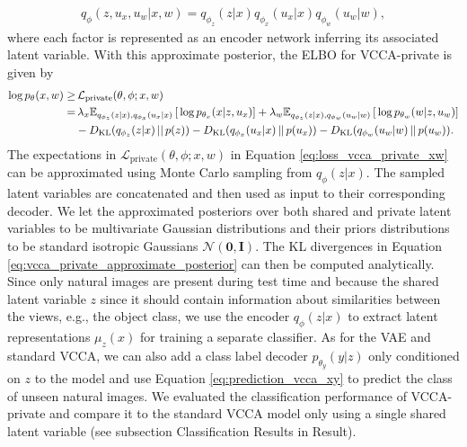 \begin{align}\label{eq:vcca_private_approximate_posterior}
    q_{\phi}(z, u_{x}, u_{w} | x, w) = q_{\phi_{z}}(z | x) q_{\phi_{x}}(u_{x} | x) q_{\phi_{w}}(u_{w} | w),
\end{align}
where each factor is represented as an encoder network inferring its associated latent variable. With this approximate posterior, the ELBO for VCCA-private is given by
\begin{align}
    \begin{split} \label{eq:loss_vcca_private_xw}
        \log p_{\theta}(x, w) \geq & \, \mathcal{L}_{\text{private}}(\theta, \phi; x, w) \\ 
        = & \, \lambda_{x} \mathbb{E}_{q_{\phi_{z}}(z|x), q_{\phi_{x}}(u_{x}|x)}\left[\, \log p_{\theta_{x}}(x | z, u_{x}) \right] + \lambda_{w}  \mathbb{E}_{q_{\phi_{z}}(z|x), q_{\phi_{w}}(u_{w}|w)}\left[\, \log p_{\theta_{w}}(w | z, u_{w}) \right] \\ 
        & - D_{\mathrm{KL}}(q_{\phi_{z}}(z|x)\,||\,p(z)) - D_{\mathrm{KL}}(q_{\phi_{x}}(u_{x}|x)\,||\,p(u_{x})) - D_{\mathrm{KL}}(q_{\phi_{w}}(u_{w} |w)\,||\,p(u_{w})) .
    \end{split}
\end{align}
The expectations in $\mathcal{L}_{\text{private}}(\theta, \phi; x, w)$ in Equation \ref{eq:loss_vcca_private_xw} can be approximated using Monte Carlo sampling from $q_{\phi}(z | x)$. The sampled latent variables are concatenated and then used as input to their corresponding decoder. We let the approximated posteriors over both shared and private latent variables to be multivariate Gaussian distributions and their priors distributions to be standard isotropic Gaussians $\mathcal{N}(\bm{0}, \mathbf{I})$. The KL divergences in Equation \ref{eq:vcca_private_approximate_posterior} can then be computed analytically. 
Since only natural images are present during test time and because the shared latent variable $z$ since it should contain information about similarities between the views, e.g., the object class, we use the encoder $q_{\phi}(z|x)$ to extract latent representations $\mu_{z}(x)$ for training a separate classifier. As for the VAE and standard VCCA, we can also add a class label decoder $p_{\theta_{y}}(y | z)$ only conditioned on $z$ to the model and use Equation \ref{eq:prediction_vcca_xy} to predict the class of unseen natural images. We evaluated the classification performance of VCCA-private and compare it to the standard VCCA model only using a single shared latent variable (see subsection Classification Results in Result). %


